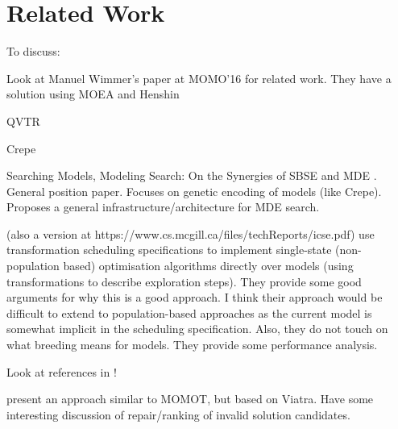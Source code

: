 \section{Related Work}
\label{section:related_work}

	\begin{draftlist}
		To discuss:
		\item Look at Manuel Wimmer's paper at MOMO'16 for related work. They have a solution using MOEA and Henshin
		\item QVTR
		\item Crepe
		\item Searching Models, Modeling Search: On the Synergies of SBSE and MDE \cite{Kessentini+13}. General position paper. Focuses on genetic encoding of models 
		      (like Crepe). Proposes a general infrastructure/architecture for MDE search.
		\item \cite{Denil+14} (also a version at https://www.cs.mcgill.ca/files/techReports/icse.pdf) use transformation scheduling specifications to implement 
		      single-state (non-population based) optimisation algorithms directly over models 
		      (using transformations to describe exploration steps). They provide some good arguments for why this is a good approach. I think their approach would be
					difficult to extend to population-based approaches as the current model is somewhat implicit in the scheduling specification. Also, they do not touch on
					what breeding means for models. They provide some performance analysis.
					
					Look at references in \cite{Denil+14}!
					
		\item \cite{Abdeen+14} present an approach similar to MOMOT, but based on Viatra. Have some interesting discussion of repair/ranking of invalid solution
		      candidates.
	\end{draftlist}
